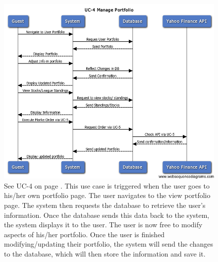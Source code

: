 \begin{figure}
\centering
\includegraphics[width=5.5in]{./img/uc4.png}
\caption{See UC-4 on page \pageref{UC-4}. This use case is triggered when the user
goes to his/her own portfolio page. The
user navigates to the view portfolio page. The system then requests the database
to retrieve the user’s information. Once the database sends this data back to the
system, the system displays it to the user. The user is now free to modify aspects of
his/her portfolio. Once the user is finished modifying/updating their portfolio, the
system will send the changes to the database, which will then store the information
and save it.}
\end{figure}


